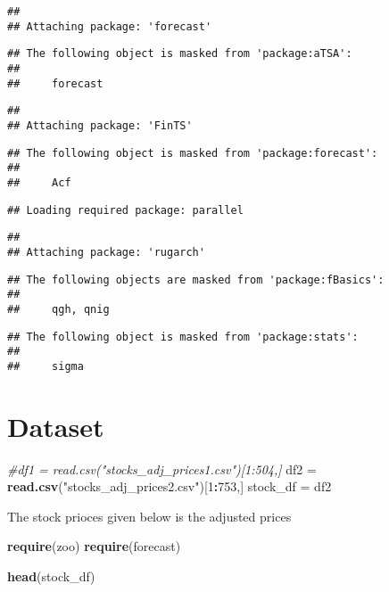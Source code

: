 \documentclass[
]{article}
\newenvironment{Shaded}{\begin{snugshade}}{\end{snugshade}}
\newcommand{\CommentTok}[1]{\textcolor[rgb]{0.56,0.35,0.01}{\textit{#1}}}
\newcommand{\DecValTok}[1]{\textcolor[rgb]{0.00,0.00,0.81}{#1}}
\newcommand{\FunctionTok}[1]{\textcolor[rgb]{0.13,0.29,0.53}{\textbf{#1}}}
\newcommand{\NormalTok}[1]{#1}
\newcommand{\OtherTok}[1]{\textcolor[rgb]{0.56,0.35,0.01}{#1}}
\newcommand{\SpecialCharTok}[1]{\textcolor[rgb]{0.81,0.36,0.00}{\textbf{#1}}}
\newcommand{\StringTok}[1]{\textcolor[rgb]{0.31,0.60,0.02}{#1}}
\begin{document}
\begin{verbatim}
## 
## Attaching package: 'forecast'
\end{verbatim}

\begin{verbatim}
## The following object is masked from 'package:aTSA':
## 
##     forecast
\end{verbatim}

\begin{verbatim}
## 
## Attaching package: 'FinTS'
\end{verbatim}

\begin{verbatim}
## The following object is masked from 'package:forecast':
## 
##     Acf
\end{verbatim}

\begin{verbatim}
## Loading required package: parallel
\end{verbatim}

\begin{verbatim}
## 
## Attaching package: 'rugarch'
\end{verbatim}

\begin{verbatim}
## The following objects are masked from 'package:fBasics':
## 
##     qgh, qnig
\end{verbatim}

\begin{verbatim}
## The following object is masked from 'package:stats':
## 
##     sigma
\end{verbatim}

\section{Dataset}\label{dataset}

\begin{Shaded}
\begin{Highlighting}[]
\CommentTok{\#df1 = read.csv("stocks\_adj\_prices1.csv")[1:504,]}
\NormalTok{df2 }\OtherTok{=} \FunctionTok{read.csv}\NormalTok{(}\StringTok{"stocks\_adj\_prices2.csv"}\NormalTok{)[}\DecValTok{1}\SpecialCharTok{:}\DecValTok{753}\NormalTok{,]}
\NormalTok{stock\_df }\OtherTok{=}\NormalTok{ df2}
\end{Highlighting}
\end{Shaded}

The stock prioces given below is the adjusted prices

\begin{Shaded}
\begin{Highlighting}[]
\FunctionTok{require}\NormalTok{(zoo)}
\FunctionTok{require}\NormalTok{(forecast)}



\FunctionTok{head}\NormalTok{(stock\_df)}
\end{Highlighting}
\end{Shaded}
\end{document}
